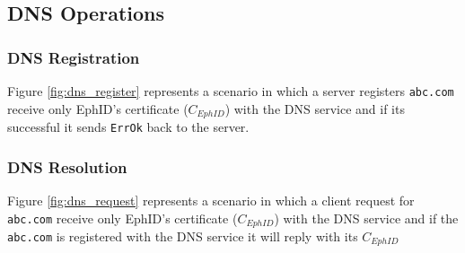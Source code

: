 \subsection{DNS Operations}
\subsubsection{DNS Registration}
Figure \ref{fig:dns_register} represents a scenario in which a server registers \texttt{abc.com} receive only EphID's certificate ($C_{EphID}$) with the DNS service and if its successful it sends \texttt{ErrOk} back to the server.

\subsubsection{DNS Resolution}
Figure \ref{fig:dns_request} represents a scenario in which a client request for \texttt{abc.com} receive only EphID's certificate ($C_{EphID}$) with the DNS service and if the \texttt{abc.com} is registered with the DNS service it will reply with its $C_{EphID}$

